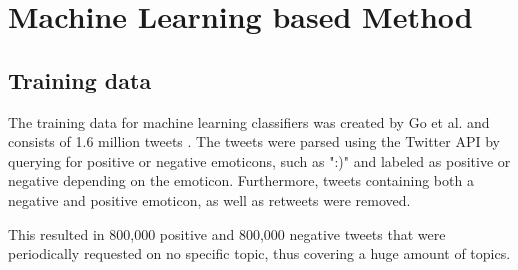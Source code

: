 \section{Machine Learning based Method}


\subsection{Training data}
The training data for machine learning classifiers was created by Go et al. and consists of 1.6 million tweets \cite{GoBHaHua2009}. The tweets were parsed using the Twitter API by querying for positive or negative emoticons, such as ":)" and labeled as positive or negative depending on the emoticon. Furthermore, tweets containing both a negative and positive emoticon, as well as retweets were removed.

This resulted in 800,000 positive and 800,000 negative tweets that were periodically requested on no specific topic, thus covering a huge amount of topics.


